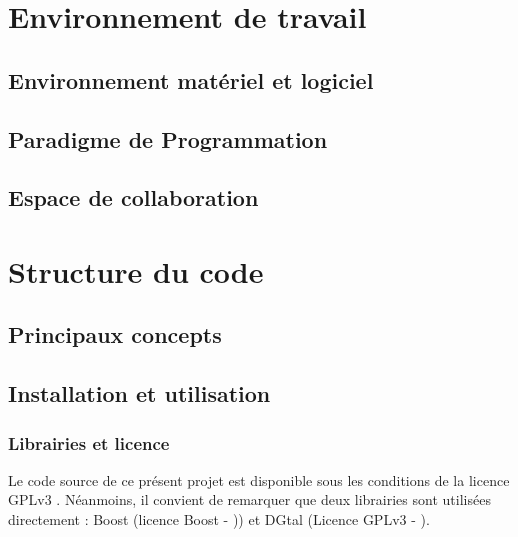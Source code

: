 %
%
%


\chapter{Environnement de travail}
\label{pt2-ch1-et} %

\section{Environnement matériel et logiciel}
\label{pt2-ch1-sec:1}

\section{Paradigme de Programmation}
\label{pt2-ch1-sec:2}

\section{Espace de collaboration}
\label{pt2-ch1-sec:3}

\chapter{Structure du code}
\label{pt2-ch2-sd} %

\section{Principaux concepts}
\label{pt2-ch2-sec:1}

\section{Installation et utilisation}
\label{pt2-ch2-sec:2}

\subsection{Librairies et licence}
\label{pt2-ch2-sec:2:1}

Le code source de ce présent projet est disponible sous les conditions de la licence GPLv3 \cite{GPLv3}. Néanmoins, il convient de remarquer que deux librairies sont utilisées directement : Boost (licence Boost  - \cite{boost-licence})) et DGtal (Licence GPLv3 - \cite{GPLv3}).

